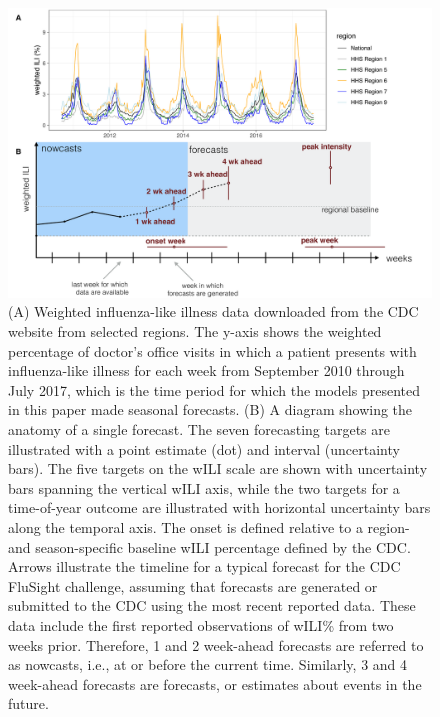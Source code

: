 \documentclass[9pt,twocolumn,twoside]{pnas-new}\usepackage[]{graphicx}\usepackage[]{color}
\begin{document}
\begin{figure}[htbp]
\centering
\includegraphics[width=\linewidth]{static-figures/timezero-sketch.pdf}
\caption{(A) Weighted influenza-like illness data downloaded from the CDC website from selected regions. The y-axis shows the weighted percentage of doctor's office visits in which a patient presents with influenza-like illness for each week from September 2010 through July 2017, which is the time period for which the models presented in this paper made seasonal forecasts. (B) A diagram showing the anatomy of a single forecast. The seven forecasting targets are illustrated with a point estimate (dot) and interval (uncertainty bars). The five targets on the wILI scale are shown with uncertainty bars spanning the vertical wILI axis, while the two targets for a time-of-year outcome are illustrated with horizontal uncertainty bars along the temporal axis. The onset is defined relative to a region- and season-specific baseline wILI percentage defined by the CDC.\cite{biggerstaff2018systematic} Arrows illustrate the timeline for a typical forecast for the CDC FluSight challenge, assuming that forecasts are generated or submitted to the CDC using the most recent reported data. These data include the first reported observations of wILI\% from two weeks prior. Therefore, 1 and 2 week-ahead forecasts are referred to as nowcasts, i.e., at or before the current time. Similarly, 3 and 4 week-ahead forecasts are forecasts, or estimates about events in the future.}
\label{fig:intro-schematic}
\end{figure}


\end{document}
